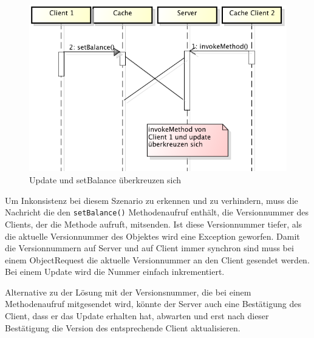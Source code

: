 \begin{figure}[h]
  \centering
\includegraphics[scale=0.3]{images_objectcaching/conflictCross}  
  \caption{Update und setBalance überkreuzen sich}
  \label{fig:messagecross}
\end{figure}


Um Inkonsistenz bei diesem Szenario zu erkennen und zu verhindern, muss die Nachricht die den \verb|setBalance()| Methodenaufruf enthält, die Versionnummer des Clients, der die Methode aufruft, mitsenden. Ist diese Versionnummer tiefer, als die aktuelle Versionnummer des Objektes wird eine Exception geworfen. Damit die Versionnummern auf Server und auf Client immer synchron sind muss bei einem ObjectRequest die aktuelle Versionnummer an den Client gesendet werden. Bei einem Update wird die Nummer einfach inkrementiert.

Alternative zu der Lösung mit der Versionsnummer, die bei einem Methodenaufruf mitgesendet wird, könnte der Server auch eine Bestätigung des Client, dass er das Update erhalten hat, abwarten und erst nach dieser Bestätigung die Version des entsprechende Client aktualisieren.

